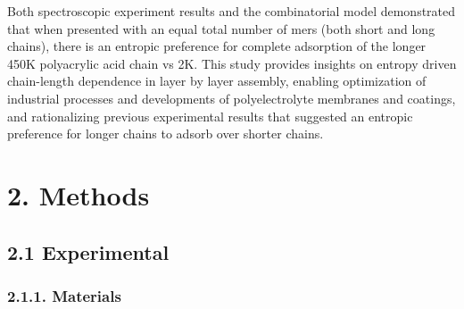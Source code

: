 \documentclass[journal=mamobx,manuscript=article]{achemso}
\begin{document}
Both spectroscopic experiment results and the 
combinatorial model demonstrated that when presented with an equal total number of mers (both short and long chains),
there is an entropic preference for complete adsorption of the longer 450K polyacrylic acid chain vs 2K. This study provides insights on entropy driven chain-length dependence in layer by layer assembly, enabling optimization of industrial processes and developments of polyelectrolyte membranes and coatings, and rationalizing previous experimental results that suggested an entropic preference for longer chains to adsorb over shorter chains.

\section{2. Methods}  %
     \label{sec-methods}
     
\subsection{2.1 Experimental}  %
    \label{sec-meth-exp}

\subsubsection{2.1.1. Materials}   %
       \label{sec-materials}
\end{document}

